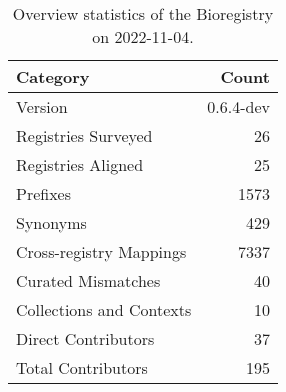 \begin{table}
\centering
\caption{Overview statistics of the Bioregistry on 2022-11-04.}
\label{tab:bioregistry-summary}
\begin{tabular}{lr}
\toprule
                Category &     Count \\
\midrule
                 Version & 0.6.4-dev \\
     Registries Surveyed &        26 \\
      Registries Aligned &        25 \\
                Prefixes &      1573 \\
                Synonyms &       429 \\
 Cross-registry Mappings &      7337 \\
      Curated Mismatches &        40 \\
Collections and Contexts &        10 \\
     Direct Contributors &        37 \\
      Total Contributors &       195 \\
\bottomrule
\end{tabular}
\end{table}
